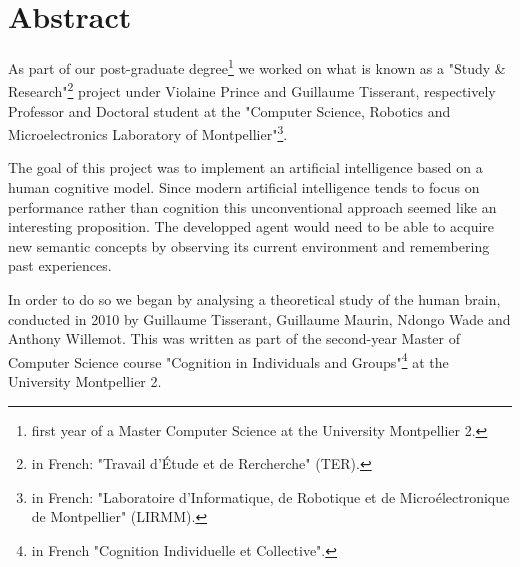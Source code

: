 \chapter*{Abstract}

As part of our post-graduate degree\footnote{first year of a Master Computer Science at the University Montpellier 2.} we worked on what is known as a "Study \& Research"\footnote{in French: "Travail d'Étude et de Rercherche" (TER).} project under \mbox{Violaine} \mbox{Prince} and \mbox{Guillaume} \mbox{Tisserant}, respectively Professor and Doctoral student at the "Computer Science, Robotics and Microelectronics Laboratory of Montpellier"\footnote{in French: "Laboratoire d'Informatique, de Robotique et de Microélectronique de Montpellier" (LIRMM).}. 

The goal of this project was to implement an artificial intelligence based on a human cognitive model. Since modern artificial intelligence tends to focus on performance rather than cognition this unconventional approach seemed like an interesting proposition. 
The developped agent would need to be able to acquire new semantic concepts by observing its current environment and remembering past experiences. 

In order to do so we began by analysing a theoretical study of the human brain, conducted in 2010 by \mbox{Guillaume} \mbox{Tisserant}, \mbox{Guillaume} \mbox{Maurin}, \mbox{Ndongo} \mbox{Wade} and \mbox{Anthony} \mbox{Willemot}. This was written as part of the second-year Master of Computer Science course "Cognition in Individuals and Groups"\footnote{in French "Cognition Individuelle et Collective".} at the University Montpellier 2.

